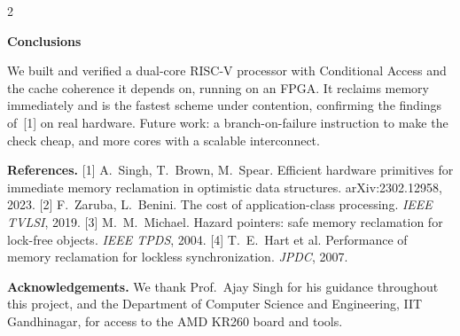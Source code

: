 \documentclass{article}
\newcommand{\smallsize}{\fontsize{14}{17.5}\selectfont}
\newcommand{\headsize}{\fontsize{30}{36}\selectfont}
\newcounter{psec}
\newcommand{\psection}[1]{%
  \par\vspace{10pt}\stepcounter{psec}%
  {\headsize\bfseries\color{navy}\thepsec\hspace{0.5em}#1\par}%
  \vspace{-3pt}{\color{navy}\rule{\columnwidth}{1.2pt}}\par\vspace{-4pt}}
\begin{document}
\begin{multicols}{2}
\psection{Conclusions}
We built and verified a dual-core RISC-V processor with Conditional Access and the cache
coherence it depends on, running on an FPGA. It reclaims memory immediately and is the
fastest scheme under contention, confirming the findings of~[1] on real hardware.
Future work: a branch-on-failure instruction to make the check cheap, and more cores with a scalable interconnect.

\vspace{4pt}
{\smallsize
\textbf{References.}
[1] A.~Singh, T.~Brown, M.~Spear. Efficient hardware primitives for immediate memory
reclamation in optimistic data structures. arXiv:2302.12958, 2023.
[2] F.~Zaruba, L.~Benini. The cost of application-class processing. \emph{IEEE TVLSI}, 2019.
[3] M.~M.~Michael. Hazard pointers: safe memory reclamation for lock-free objects.
\emph{IEEE TPDS}, 2004.
[4] T.~E.~Hart et al. Performance of memory reclamation for lockless synchronization.
\emph{JPDC}, 2007.\par\vspace{3pt}
\textbf{Acknowledgements.} We thank Prof.\ Ajay Singh for his guidance throughout this
project, and the Department of Computer Science and Engineering, IIT Gandhinagar, for
access to the AMD KR260 board and tools.\par}

\end{multicols}
\end{document}
